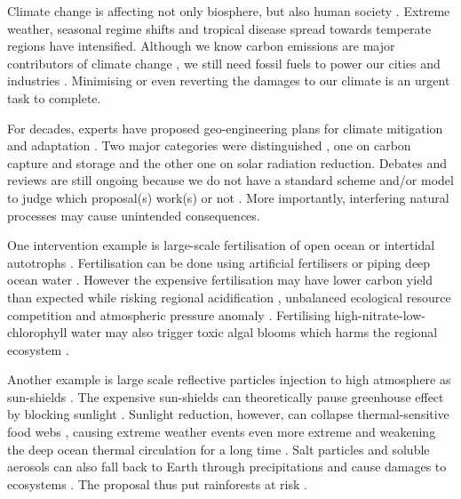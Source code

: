 \documentclass[../thesis.tex]{subfiles} %
\begin{document}
Climate change is affecting not only biosphere, but also human society \autocite{notz2016observed,schuur2015climate}.  Extreme weather, seasonal regime shifts and tropical disease spread towards temperate regions have intensified.  Although we know carbon emissions are major contributors of climate change \autocite{notz2016observed}, we still need fossil fuels to power our cities and industries \autocite{ferguson2000electricity}.  Minimising or even reverting the damages to our climate is an urgent task to complete.

For decades, experts have proposed geo-engineering plans for climate mitigation and adaptation \autocite{farrelly2013carbon,yang2008progress,boyd2008ranking,boettcher2019high,vaughan2011review}.  Two major categories were distinguished \autocite{boyd2008ranking}, one on carbon capture and storage and the other one on solar radiation reduction.  Debates and reviews are still ongoing because we do not have a standard scheme and/or model to judge which proposal(s) work(s) or not \autocite{boyd2008ranking,boettcher2019high,boyd2016development,oschlies2017indicators,gattuso2018ocean}.  More importantly, interfering natural processes may cause unintended consequences.

One intervention example is large-scale fertilisation of open ocean \autocite{gnanadesikan2008export,lovelock2007ocean,lawrence2014efficiency} or intertidal autotrophs \autocite{duarte2017can,johannessen2016geoengineering,krause2016substantial}.  Fertilisation can be done using artificial fertilisers \autocite{gnanadesikan2008export,lawrence2014efficiency,trick2010iron} or piping deep ocean water \autocite{kwiatkowski2015atmospheric,lovelock2007ocean}.  However the expensive fertilisation may have lower carbon yield than expected \autocite{boyd2008implications,gnanadesikan2008export,oschlies2010side} while risking regional acidification \autocite{oschlies2010side}, unbalanced ecological resource competition \autocite{chung2011using,thiele2012microbial,batten2014did} and atmospheric pressure anomaly \autocite{kwiatkowski2015atmospheric}.  Fertilising high-nitrate-low-chlorophyll water may also trigger toxic algal blooms which harms the regional ecosystem \autocite{trick2010iron}.

Another example is large scale reflective particles injection to high atmosphere as sun-shields \autocite{latham2008global,stjern2018response,xia2016stratospheric}.  The expensive sun-shields \autocite{boyd2008implications} can theoretically pause greenhouse effect by blocking sunlight \autocite{williamson2012impacts}.  Sunlight reduction, however, can collapse thermal-sensitive food webs \autocite{williamson2012impacts}, causing extreme weather events even more extreme \autocite{jones2009climate} and weakening the deep ocean thermal circulation for a long time \autocite{lauvset2017climate,williamson2012impacts}.  Salt particles and soluble aerosols can also fall back to Earth through precipitations and cause damages to ecosystems \autocite{bala2011albedo}.  The proposal thus put rainforests at risk \autocite{muri2015tropical}.
\end{document}
